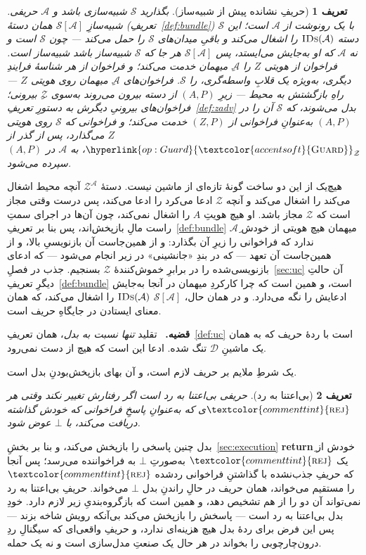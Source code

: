 \documentclass[10pt,oneside,openany]{book}
\newcommand{\Zenv}{\mathcal{Z}}
\newcommand{\Adv}{\mathcal{A}}
\newcommand{\Dum}{\mathcal{D}}
\newcommand{\Sim}{\mathcal{S}}
\newcommand{\op}[1]{\textnormal{\textsc{#1}}}
\newcommand{\opl}[1]{\hyperlink{op:#1}{\textcolor{accentsoft}{\op{#1}}}}
\newcommand{\IDs}{\op{IDs}}
\newcommand{\atom}[1]{\textcolor{commenttint}{\op{#1}}}
\newcommand{\rej}{\atom{rej}}
\newcommand{\none}{\bot}
\newcommand{\heading}[1]{\medskip\par\noindent\textcolor{accent}{\textbf{#1.}}\ }
\theoremstyle{accentdef}
\newtheorem{definition}{تعریف}[chapter]
\theoremstyle{accentplain}
\begin{document}
\begin{definition}[حریفِ نشانده پیش از شبیه‌ساز]\label{def:sadv}
بگذارید $\Sim$ شبیه‌سازی باشد و $\Adv$ حریفی. شبیه‌سازِ $\Sim[\Adv]$ همان
دستهٔ (تعریفِ~\ref{def:bundle}) $\Sim$ با یک رونوشت از $\Adv$ است؛ این دسته
$\IDs(\Adv)$ را اشغال می‌کند و باقیِ میدان‌های $\Sim$ را حمل می‌کند ---
چون $\Sim$ است و نه $\Adv$ که او به‌جایش می‌ایستد، پس $\Sim[\Adv]$ هر جا
که $\Sim$ شبیه‌ساز باشد شبیه‌ساز است. فراخوان از هویتی $Z$ را $\Adv$ِ
میهمان خدمت می‌کند؛ و فراخوان از هر شناسهٔ فرایندِ دیگری، به‌ویژه یک قلابِ
واسطه‌گری، را $\Sim$. فراخوان‌های $\Adv$ِ میهمان روی هویتی $Z$ --- راهِ
بازگشتش به محیط --- زیرِ $(A,P)$ از دسته بیرون می‌روند به‌سوی $\Zenv$ِ
بیرونی؛ فراخوان‌های بیرونیِ دیگرش به دستورِ تعریفِ~\ref{def:zadv} بدل
می‌شوند، که $\Sim$ آن را در $(A,P)$ به‌عنوانِ فراخوانی از $(Z,P)$ خدمت
می‌کند؛ و فراخوانی که $\Sim$ روی هویتی $Z$ می‌گذارد، پس از گذر از
$\opl{Guard}_{\Zenv}$، به $\Adv$ در $(A,P)$ سپرده می‌شود.
\end{definition}

هیچ‌یک از این دو ساخت گونهٔ تازه‌ای از ماشین نیست. دستهٔ $\Zenv^{\Adv}$ آنچه
محیط اشغال می‌کند را اشغال می‌کند و آنچه $\Zenv$ ادعا می‌کرد را ادعا
می‌کند، پس درست وقتی مجاز است که $\Zenv$ مجاز باشد. او هیچ هویتِ $A$ را
اشغال نمی‌کند، چون آن‌ها در اجرای سمتِ راست مالِ بازپخش‌اند، پس بنا بر
تعریفِ~\ref{def:bundle} $\Adv$ِ میهمان هیچ هویتی از خودش ندارد که فراخوانی
را زیرِ آن بگذارد: و از همین‌جاست آن بازنویسیِ بالا، و از همین‌جاست آن
تعهد --- که در بندِ «جانشینی» در زیر انجام می‌شود --- که ادعای
بازنویسی‌شده را در برابرِ خموش‌کنندهٔ $\Zenv$ بسنجیم. جذب در
فصلِ~\ref{sec:uc} آن حالتِ دیگرِ تعریفِ~\ref{def:bundle} است، و همین است که
چرا کارکردِ میهمان در آنجا به‌جایش ادعایش را نگه می‌دارد. و در همان حال،
$\Sim[\Adv]$ $\IDs(\Adv)$ را اشغال می‌کند، که همان معنای ایستادن در جایگاهِ
حریف است.

\heading{قضیه} تقلید \emph{تنها نسبت به بدل}، همان تعریفِ~\ref{def:uc} است
با ردهٔ حریف که به همان یک ماشینِ $\Dum$ تنگ شده. ادعا این است که هیچ از
دست نمی‌رود.

یک شرطِ ملایم بر حریف لازم است، و آن بهای بازپخش‌بودنِ بدل است.

\begin{definition}[بی‌اعتنا به رد]\label{def:refobl}
حریفی \emph{بی‌اعتنا به رد} است اگر رفتارش تغییر نکند وقتی هر $\rej$ی که
به‌عنوانِ پاسخِ فراخوانی که خودش گذاشته دریافت می‌کند، با $\none$ عوض
شود.
\end{definition}

بدل چنین پاسخی را بازپخش می‌کند، و بنا بر بخشِ~\ref{sec:execution}
\textbf{return}ِ خودش از یک $\rej$ به‌صورتِ $\none$ به فراخواننده می‌رسد؛
پس آنجا که حریفِ جذب‌نشده با گذاشتنِ فراخوانی ردشده $\rej$ را مستقیم
می‌خواند، همان حریف در حالِ راندنِ بدل $\none$ می‌خواند. حریفِ بی‌اعتنا به
رد نمی‌تواند آن دو را از هم تشخیص دهد، و همین است که بازگروه‌بندیِ زیر
لازم دارد. خودِ بدل بی‌اعتنا به رد است --- پاسخش را بازپخش می‌کند بی‌آنکه
رویش شاخه بزند --- پس این فرض برای ردهٔ بدل هیچ هزینه‌ای ندارد، و حریفِ
واقعی‌ای که سیگنالِ ردِ درون‌چارچوبی را بخواند در هر حال یک صنعتِ
مدل‌سازی است و نه یک حمله.
\end{document}
